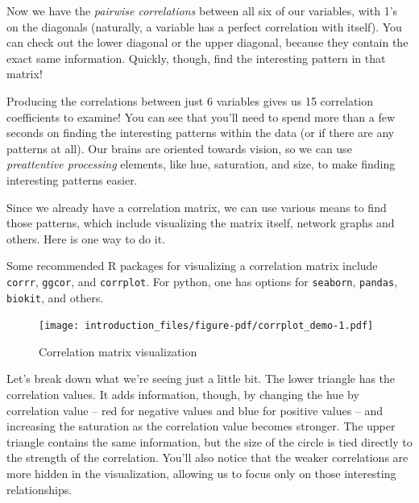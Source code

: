 \documentclass[
  letterpaper,
]{krantz}
\begin{document}
Now we have the \emph{pairwise correlations} between all six of our
variables, with 1's on the diagonals (naturally, a variable has a
perfect correlation with itself). You can check out the lower diagonal
or the upper diagonal, because they contain the exact same information.
Quickly, though, find the interesting pattern in that matrix!

Producing the correlations between just 6 variables gives us 15
correlation coefficients to examine! You can see that you'll need to
spend more than a few seconds on finding the interesting patterns within
the data (or if there are any patterns at all). Our brains are oriented
towards vision, so we can use \emph{preattentive processing} elements,
like hue, saturation, and size, to make finding interesting patterns
easier.

Since we already have a correlation matrix, we can use various means to
find those patterns, which include visualizing the matrix itself,
network graphs and others. Here is one way to do it.

\begin{tcolorbox}[enhanced jigsaw, opacityback=0, leftrule=.75mm, bottomrule=.15mm, colframe=quarto-callout-note-color-frame, rightrule=.15mm, breakable, left=2mm, colback=white, arc=.35mm, toprule=.15mm]

Some recommended R packages for visualizing a correlation matrix include
\texttt{corrr}, \texttt{ggcor}, and \texttt{corrplot}. For python, one
has options for \texttt{seaborn}, \texttt{pandas}, \texttt{biokit}, and
others.

\end{tcolorbox}

\begin{figure}[H]

{\centering \texttt{[image: introduction\_files/figure-pdf/corrplot\_demo-1.pdf]}

}

\caption{Correlation matrix visualization}

\end{figure}%

Let's break down what we're seeing just a little bit. The lower triangle
has the correlation values. It adds information, though, by changing the
hue by correlation value -- red for negative values and blue for
positive values -- and increasing the saturation as the correlation
value becomes stronger. The upper triangle contains the same
information, but the size of the circle is tied directly to the strength
of the correlation. You'll also notice that the weaker correlations are
more hidden in the visualization, allowing us to focus only on those
interesting relationships.
\end{document}
